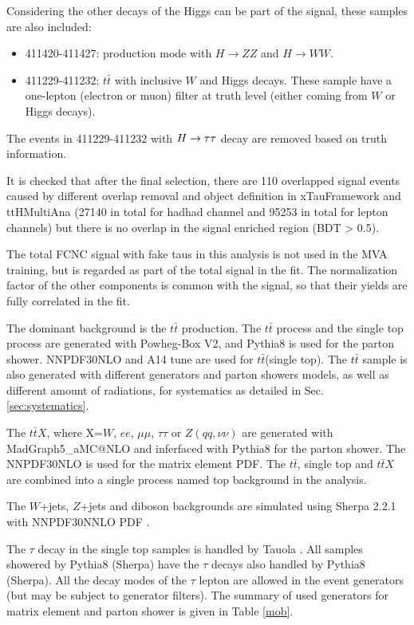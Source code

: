Considering the other decays of the Higgs can be part of the signal, these samples are also included:

\begin{itemize}
	\item 411420-411427: production mode with $H\to ZZ$ and $H\to WW$.
	\item 411229-411232: $t\bar t$ with inclusive $W$ and Higgs decays. These sample have a one-lepton (electron or muon) filter at truth level (either coming from $W$ or Higgs decays).
\end{itemize}

The events in 411229-411232 with $H \rightarrow \tau\tau$ decay are removed based on truth information.

It is checked that after the final selection, there are 110 overlapped signal events caused by different overlap removal and object definition in xTauFramework and ttHMultiAna (27140 in total for hadhad channel and 95253 in total for lepton channels) but there is no overlap in the signal enriched region (BDT > 0.5).

The total FCNC signal with fake taus in this analysis is not used in the MVA training, but is regarded as part of the total signal in the fit. The normalization factor of the other components is common with the signal, so that their yields are fully correlated in the fit.

The dominant background is the $t\bar{t}$ production. The $t\bar{t}$ process and the single top process are generated with Powheg-Box \cite{Powheg} V2, and Pythia8 is used for the parton shower. NNPDF30NLO \cite{NNPDF30NLO} and A14 tune \cite{A14} are used for $t\bar{t}$(single top). The $t\bar{t}$ sample is also generated with different generators and parton showers models, as well as different amount of radiations, for systematics as detailed in Sec. \ref{sec:systematics}.

The $t\bar{t}X$, where X=$W$, $ee$, $\mu\mu$, $\tau\tau$ or $Z(qq,\nu\nu)$ are generated with MadGraph5\_aMC@NLO and inferfaced with Pythia8 for the parton shower. The NNPDF30NLO \cite{NNPDF30NLO} is used for the matrix element PDF. The $t\bar{t}$, single top and $t\bar{t}X$ are combined into a single process named top background in the analysis.

The $W$+jets, $Z$+jets and diboson backgrounds are simulated using Sherpa 2.2.1 \cite{Sherpa} with NNPDF30NNLO PDF \cite{NNPDF30NLO}.

The $\tau$ decay in the single top samples is handled by Tauola \cite{Tauola}. All samples showered by Pythia8 (Sherpa) have the $\tau$ decays also handled by Pythia8 (Sherpa). All the decay modes of the $\tau$ lepton are allowed in the event generators (but may be subject to generator filters). The summary of used generators for matrix element and parton shower is given in Table \ref{mob}.

